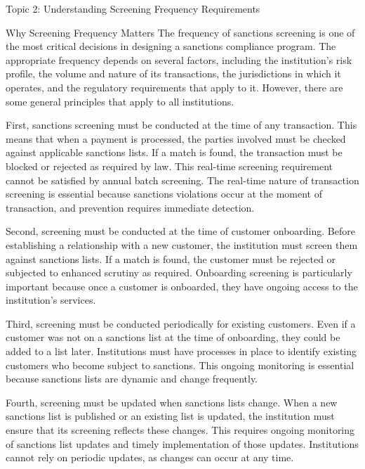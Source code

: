 \documentclass[8pt]{beamer}  %
\begin{document}
	\begin{frame}{Topic 2: Understanding Screening Frequency Requirements}
		\begin{block}{\large Why Screening Frequency Matters}
			The frequency of sanctions screening is one of the most critical decisions in designing a sanctions compliance program. The appropriate frequency depends on several factors, including the institution's risk profile, the volume and nature of its transactions, the jurisdictions in which it operates, and the regulatory requirements that apply to it. However, there are some general principles that apply to all institutions.
			
			First, sanctions screening must be conducted at the time of any transaction. This means that when a payment is processed, the parties involved must be checked against applicable sanctions lists. If a match is found, the transaction must be blocked or rejected as required by law. This real-time screening requirement cannot be satisfied by annual batch screening. The real-time nature of transaction screening is essential because sanctions violations occur at the moment of transaction, and prevention requires immediate detection.
			
			Second, screening must be conducted at the time of customer onboarding. Before establishing a relationship with a new customer, the institution must screen them against sanctions lists. If a match is found, the customer must be rejected or subjected to enhanced scrutiny as required. Onboarding screening is particularly important because once a customer is onboarded, they have ongoing access to the institution's services.
			
			Third, screening must be conducted periodically for existing customers. Even if a customer was not on a sanctions list at the time of onboarding, they could be added to a list later. Institutions must have processes in place to identify existing customers who become subject to sanctions. This ongoing monitoring is essential because sanctions lists are dynamic and change frequently.
			
			Fourth, screening must be updated when sanctions lists change. When a new sanctions list is published or an existing list is updated, the institution must ensure that its screening reflects these changes. This requires ongoing monitoring of sanctions list updates and timely implementation of those updates. Institutions cannot rely on periodic updates, as changes can occur at any time.
		\end{block}
		

\end{frame}
\end{document}
